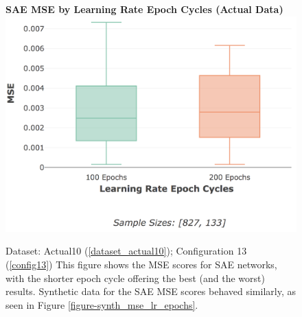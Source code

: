 \documentclass[a4paper,11pt,oneside]{article}
\theoremstyle{plain}
\theoremstyle{definition}
\begin{document}
		\begin{figure}[H]
		\centering 
		\textbf{SAE MSE by Learning Rate Epoch Cycles (Actual Data)}
		\includegraphics[scale=0.3]{images/results/8_appendix/actual_mse_lr_epochs.png}
		\caption[SAE MSE by Learning Rate Epoch Cycles (Actual Data)]{Dataset: Actual10 (\ref{dataset_actual10}); Configuration 13 (\ref{config13})
			\newline This figure shows the MSE scores for SAE networks, with the shorter epoch cycle offering the best (and the worst) results. Synthetic data for the SAE MSE scores behaved similarly, as seen in Figure \ref{figure-synth_mse_lr_epochs}.}
		\label{figure-actual_mse_lr_epochs}
	\end{figure}%
	
\end{document}

